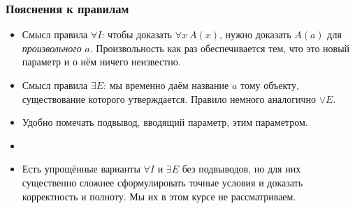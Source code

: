 \documentclass[10pt]{beamer}
\begin{document}
\begin{frame}
    \frametitle{Пояснения к правилам}
    \begin{itemize}
        \item Смысл правила $\forall I$: чтобы доказать $\forall x ~ A(x)$, нужно доказать $A(a)$ для \emph{произвольного} $a$. Произвольность как раз обеспечивается тем, что это новый параметр и о нём ничего неизвестно. \pause
        \item Смысл правила $\exists E$: мы временно даём название $a$ тому объекту, существование которого утверждается. Правило немного аналогично $\lor E$.
        \item Удобно помечать подвывод, вводящий параметр, этим параметром.
        \item[]
        \item Есть упрощённые варианты $\forall I$ и $\exists E$ без подвыводов, но для них существенно сложнее сформулировать точные условия и доказать корректность и полноту. Мы их в этом курсе не рассматриваем.
    \end{itemize}
\end{frame}
\end{document}
